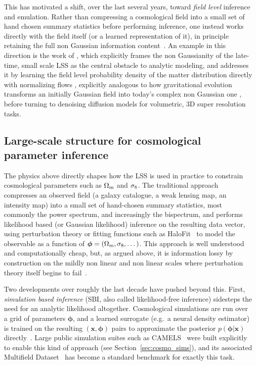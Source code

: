 This has motivated a shift, over the last several years, toward \emph{field level} inference and emulation. Rather than compressing a cosmological field into a small set of hand chosen summary statistics before performing inference, one instead works directly with the field itself (or a learned representation of it), in principle retaining the full non Gaussian information content~\citep[e.g.][]{jamieson_field-level_2023,angulo_large-scale_2022}. An example in this direction is the work of \citet{rouhiainen_cosmology_2024}, which explicitly frames the non Gaussianity of the late-time, small scale LSS as the central obstacle to analytic modeling, and addresses it by learning the field level probability density of the matter distribution directly with normalizing flows , explicitly analogous to how gravitational evolution transforms an initially Gaussian field into today's complex non Gaussian one , before turning to denoising diffusion models for volumetric, 3D super resolution tasks.

\subsection{Large-scale structure for cosmological parameter inference}
\label{sec:lss_param_inference}

The physics above directly shapes how the LSS is used in practice to constrain cosmological parameters such as $\Omega_\mathrm{m}$ and $\sigma_8$. The traditional approach compresses an observed field (a galaxy catalogue, a weak lensing map, an intensity map) into a small set of hand-chosen summary statistics, most commonly the power spectrum, and increasingly the bispectrum, and performs likelihood based (or Gaussian likelihood) inference on the resulting data vector, using perturbation theory or fitting functions such as HaloFit~\citep{Takahashi_2012} to model the observable as a function of $\bm{\phi}=(\Omega_\mathrm{m},\sigma_8,\dots)$. This approach is well understood and computationally cheap, but, as argued above, it is information lossy by construction on the mildly non linear and non linear scales where perturbation theory itself begins to fail~\citep[e.g.][]{Chudaykin_2020}.

Two developments over roughly the last decade have pushed beyond this. First, \emph{simulation based inference} (SBI, also called likelihood-free inference) sidesteps the need for an analytic likelihood altogether. Cosmological simulations are run over a grid of parameters $\bm{\phi}$, and a learned surrogate (e.g.\ a neural density estimator) is trained on the resulting $(\bm{x},\bm{\phi})$ pairs to approximate the posterior $p(\bm{\phi}|\bm{x})$ directly~\citep[e.g.][]{jeffrey_likelihood-free_2020,angulo_large-scale_2022}. Large public simulation suites such as CAMELS~\citep{villaescusa-navarro_camels_2021} were built explicitly to enable this kind of approach (see Section~\ref{sec:cosmo_sims}), and its associated Multifield Dataset~\citep{villaescusa-navarro_camels_2022} has become a standard benchmark for exactly this task.

